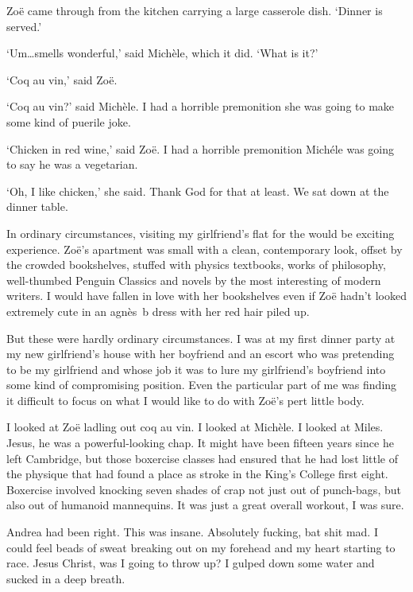 Zo{\"e} came through from the kitchen carrying a large casserole
dish. `Dinner is served.'

`Um\dots smells wonderful,' said Mich{\`e}le, which it did. `What is
it?'

`Coq au vin,' said Zo{\"e}.

`Coq au vin?' said Mich{\`e}le. I had a horrible premonition she was
going to make some kind of puerile joke.

`Chicken in red wine,' said Zo{\"e}. I had a horrible premonition
Mich{\'e}le was going to say he was a vegetarian.

`Oh, I like chicken,' she said. Thank God for that at least. We sat
down at the dinner table.

In ordinary circumstances, visiting my girlfriend's flat for the
would be exciting experience. Zo{\"e}'s apartment was small with a
clean, contemporary look, offset by the crowded bookshelves, stuffed
with physics textbooks, works of philosophy, well-thumbed Penguin
Classics and novels by the most interesting of modern writers. I
would have fallen in love with her bookshelves even if Zo{\"e}
hadn't looked extremely cute in an agn{\`e}s~b dress with her red
hair piled up.

But these were hardly ordinary circumstances. I was at my first
dinner party at my new girlfriend's house with her boyfriend and an
escort who was pretending to be my girlfriend and whose job it was
to lure my girlfriend's boyfriend into some kind of compromising
position. Even the particular part of me was finding it difficult to
focus on what I would like to do with Zo{\"e}'s pert little body.

I looked at Zo{\"e} ladling out coq au vin. I looked at Mich{\`e}le.
I looked at Miles. Jesus, he was a powerful-looking chap. It might
have been fifteen years since he left Cambridge, but those boxercise classes had ensured that he had lost
little of the physique that had found a place as stroke in the
King's College first eight. Boxercise
involved knocking seven shades of crap not just out of punch-bags,
but also out of humanoid mannequins. It was just a great overall workout,
I was sure.

Andrea had been right. This was insane. Absolutely fucking, bat shit
mad. I could feel beads of sweat breaking out on my forehead and my
heart starting to race. Jesus Christ, was I going to throw up? I
gulped down some water and sucked in a deep breath.

